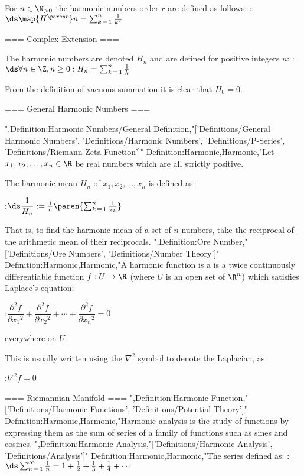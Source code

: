 For $n \in \N_{> 0}$ the harmonic numbers order $r$ are defined as follows:
:$\ds \map {H^{\paren r} } n = \sum_{k \mathop = 1}^n \frac 1 {k^r}$


=== Complex Extension ===



The harmonic numbers are denoted $H_n$ and are defined for positive integers $n$:
:$\ds \forall n \in \Z, n \ge 0: H_n = \sum_{k \mathop = 1}^n \frac 1 k$

From the definition of vacuous summation it is clear that $H_0 = 0$.

=== General Harmonic Numbers ===

",Definition:Harmonic Numbers/General Definition,"['Definitions/General Harmonic Numbers', 'Definitions/Harmonic Numbers', 'Definitions/P-Series', 'Definitions/Riemann Zeta Function']"
Definition:Harmonic,Harmonic,"Let $x_1, x_2, \ldots, x_n \in \R$ be real numbers which are all strictly positive.

The harmonic mean $H_n$ of $x_1, x_2, \ldots, x_n$ is defined as:

:$\ds \dfrac 1 {H_n} := \frac 1 n \paren {\sum_{k \mathop = 1}^n \frac 1 {x_k} }$

That is, to find the harmonic mean of a set of $n$ numbers, take the reciprocal of the arithmetic mean of their reciprocals.
",Definition:Ore Number,"['Definitions/Ore Numbers', 'Definitions/Number Theory']"
Definition:Harmonic,Harmonic,"A harmonic function is a is a twice continuously differentiable function $f: U \to \R$ (where $U$ is an open set of $\R^n$) which satisfies Laplace's equation:

:$\dfrac {\partial^2 f} {\partial {x_1}^2} + \dfrac {\partial^2 f} {\partial {x_2}^2} + \cdots + \dfrac {\partial^2 f} {\partial {x_n}^2} = 0$

everywhere on $U$.


This is usually written using the $\nabla^2$ symbol to denote the Laplacian, as:

:$\nabla^2 f = 0$


=== Riemannian Manifold ===
",Definition:Harmonic Function,"['Definitions/Harmonic Functions', 'Definitions/Potential Theory']"
Definition:Harmonic,Harmonic,"Harmonic analysis is the study of functions by expressing them as the sum of series of a family of functions such as sines and cosines.
",Definition:Harmonic Analysis,"['Definitions/Harmonic Analysis', 'Definitions/Analysis']"
Definition:Harmonic,Harmonic,"The series defined as:
:$\ds \sum_{n \mathop = 1}^\infty \frac 1 n = 1 + \frac 1 2 + \frac 1 3 + \frac 1 4 + \cdots$

